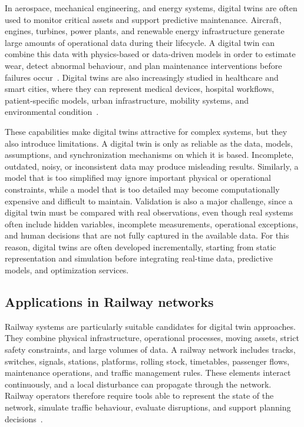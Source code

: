 In aerospace, mechanical engineering, and energy systems, digital twins are often used to monitor critical assets and 
support predictive maintenance. Aircraft, engines, turbines, power plants, and renewable energy infrastructure generate 
large amounts of operational data during their lifecycle. A digital twin can combine this data with physics-based or 
data-driven models in order to estimate wear, detect abnormal behaviour, and plan maintenance interventions before 
failures occur~\cite{turbomachinery_review}. Digital twins are also increasingly studied in healthcare and smart cities, 
where they can represent medical devices, hospital workflows, patient-specific models, urban infrastructure, mobility 
systems, and environmental condition~\cite{aircraft_digital_twin}.

These capabilities make digital twins attractive for complex systems, but they also introduce limitations. A digital twin 
is only as reliable as the data, models, assumptions, and synchronization mechanisms on which it is based. Incomplete, 
outdated, noisy, or inconsistent data may produce misleading results. Similarly, a model that is too simplified may ignore 
important physical or operational constraints, while a model that is too detailed may become computationally expensive and 
difficult to maintain. Validation is also a major challenge, since a digital twin must be compared with real observations, 
even though real systems often include hidden variables, incomplete measurements, operational exceptions, and human 
decisions that are not fully captured in the available data. For this reason, digital twins are often developed 
incrementally, starting from static representation and simulation before integrating real-time data, predictive models, 
and optimization services.


\newpage

\subsection{Applications in Railway networks}
Railway systems are particularly suitable candidates for digital twin approaches. They combine physical infrastructure, 
operational processes, moving assets, strict safety constraints, and large volumes of data. A railway network includes 
tracks, switches, signals, stations, platforms, rolling stock, timetables, passenger flows, maintenance operations, and 
traffic management rules. These elements interact continuously, and a local disturbance can propagate through the network. 
Railway operators therefore require tools able to represent the state of the network, simulate traffic behaviour, evaluate 
disruptions, and support planning decisions~\cite{digital_twin_system, digital_twin_system}.

